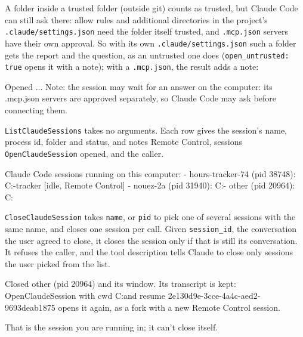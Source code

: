 \documentclass[10pt,a4paper]{article}
\newcommand{\code}[1]{\texttt{#1}}
\begin{document}
A folder inside a trusted folder (outside git) counts as trusted, but Claude Code can still ask
there: allow rules and additional directories in the project's \code{.claude/settings.json} need
the folder itself trusted, and \code{.mcp.json} servers have their own approval. So with its own
\code{.claude/settings.json} such a folder gets the report and the question, as an untrusted one
does (\code{open\_untrusted: true} opens it with a note); with a \code{.mcp.json}, the result adds
a note:
\begin{plain}
Opened ... Note: the session may wait for an answer on the computer: its .mcp.json servers are approved separately, so Claude Code may ask before connecting them.
\end{plain}

\code{ListClaudeSessions} takes no arguments. Each row gives the session's name, process id,
folder and status, and notes Remote Control, sessions \code{OpenClaudeSession} opened, and the
caller.

\begin{plain}
Claude Code sessions running on this computer:
- hours-tracker-74 (pid 38748): C:\Users\me\Projects\hours-tracker [idle, Remote Control]
- nouez-2a (pid 31940): C:\Users\me\Projects{}
- other (pid 20964): C:\Users\me\Projects{}
\end{plain}

\code{CloseClaudeSession} takes \code{name}, or \code{pid} to pick one of several sessions with the
same name, and closes one session per call. Given \code{session\_id}, the conversation the user
agreed to close, it closes the session only if that is still its conversation. It refuses the caller, and the tool description tells
Claude to close only sessions the user picked from the list.

\begin{plain}
Closed other (pid 20964) and its window. Its transcript is kept: OpenClaudeSession with cwd C:\Users\me\Projects\other and resume 2e130d9e-3cce-4a4c-aed2-9693deab1875 opens it again, as a fork with a new Remote Control session.
\end{plain}
\begin{plain}
That is the session you are running in; it can't close itself.
\end{plain}
\end{document}
